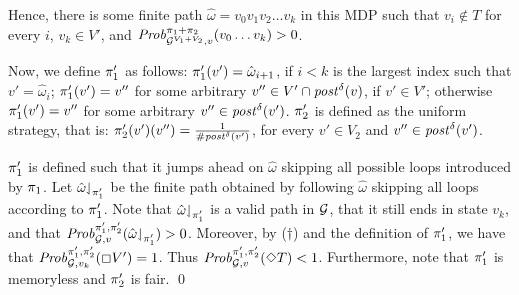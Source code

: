 \begin{myproof}
  Hence, there is some finite path $\hat{\omega} = v_0 v_1 v_2 \dots v_k$
  in this MDP such that $v_i \notin T$ for every $i$, $v_k \in V'$, and
  $\mathit{Prob}^{\pi_{1}{+}\pi_{2}}_{\mathcal{G}^{V_1+V_2},v}(v_0\dots v_k) > 0$.

  Now, we define $\pi_{1}'$ as follows:
  $\pi_{1}'(v') = \hat{\omega}_{i+1}$, if $i < k$ is the largest
  index such that $v' = \hat{\omega}_{i}$;
  $\pi_{1}'(v') = v''$ for some arbitrary $v'' \in
  V'\cap\mathit{post}^\delta(v)$, if $v' \in V'$;
  otherwise $\pi_{1}'(v') = v''$ for some arbitrary
  $v'' \in \mathit{post}^\delta(v')$.
  $\pi_{2}'$ is defined as the uniform strategy, that is:
  $\pi_{2}'(v')(v'') = \frac{1}{\# \mathit{post}^\delta(v')}$, for every $v'
  \in V_2$ and $v'' \in \mathit{post}^\delta(v')$.
  
  $\pi_{1}'$ is defined such that it jumps ahead on $\hat{\omega}$
  skipping all possible loops introduced by $\pi_{1}$.  Let
  $\hat{\omega}{\downharpoonleft}_{\pi_{1}'}$ be the finite path
  obtained by following $\hat{\omega}$ skipping all loops according
  to $\pi_{1}'$.
  Note that $\hat{\omega}{\downharpoonleft}_{\pi_{1}'}$ is a valid
  path in $\mathcal{G}$, that it still ends in state $v_k$, and that
  $\mathit{Prob}^{\pi_{1}',\pi_{2}'}_{\mathcal{G},v}({\hat{\omega}{\downharpoonleft}_{\pi_{1}'}})>0$.
  Moreover, by ($\dag$) and the definition of $\pi_{1}'$, we have
  that $\mathit{Prob}^{\pi_{1}',\pi_{2}'}_{\mathcal{G}, v_k}(\Box V') = 1$.
  Thus $\mathit{Prob}^{\pi_{1}',\pi_{2}'}_{\mathcal{G}, v}(\Diamond T) < 1$.
  Furthermore, note that $\pi_{1}'$ is memoryless and $\pi_{2}'$
  is fair.
\qed
\end{myproof}


